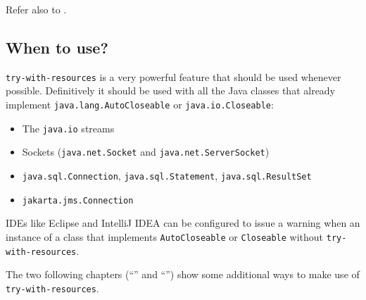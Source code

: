 Refer also to \autocite{ORACLE_DOC_LANGUAGE_SPECIFICATION:ExtendedTryWithResources}.


\subsection{When to use?}
\verb#try-with-resources# is a very powerful feature that should be used whenever possible. Definitively it should be used with all the Java classes that already implement \lstinline|java.lang.AutoCloseable| or \lstinline|java.io.Closeable|:

\begin{itemize}
\item{The \lstinline|java.io| streams}
\item{Sockets (\lstinline|java.net.Socket|\autocite{ORACLE_DOC_SOCKET_CLASS} and \lstinline|java.net.ServerSocket|\autocite{ORACLE_DOC_SERVERSOCKET_CLASS})}
\item{\lstinline|java.sql.Connection|\autocite{ORACLE_DOC_CONNECTION_INTERFACE}, \lstinline|java.sql.Statement|\autocite{ORACLE_DOC_STATEMENT_INTERFACE}, \lstinline|java.sql.ResultSet|\autocite{ORACLE_DOC_RESULTSET_INTERFACE}}
\item{\lstinline|jakarta.jms.Connection|\autocite{JAKARTA_JMS:Connection}}
\end{itemize}

IDEs like Eclipse and IntelliJ IDEA can be configured to issue a warning when an instance of a class that implements \lstinline|AutoCloseable| or \lstinline|Closeable| without \verb#try-with-resources#.

The two following chapters (“” and “”) show some additional ways to make use of \verb#try-with-resources#.


